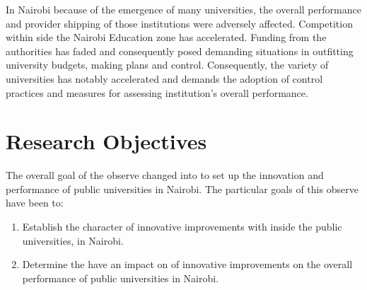 In Nairobi because of the emergence of many universities, the overall performance and provider shipping of those institutions were adversely affected. Competition within side the Nairobi Education zone has accelerated. Funding from the authorities has faded and consequently posed demanding situations in outfitting university budgets, making plans and control. Consequently, the variety of universities has notably accelerated and demands the adoption of control practices and measures for assessing institution's overall performance.

\section{\textbf{Research Objectives}}
The overall goal of the observe changed into to set up the innovation and performance of public universities in Nairobi. The particular goals of this observe have been to:
\begin{enumerate}

    \item Establish the character of innovative improvements with inside the public universities, in Nairobi.
    
    \item Determine the have an impact on of innovative improvements on the overall performance of public universities in Nairobi.
    
\end{enumerate}



